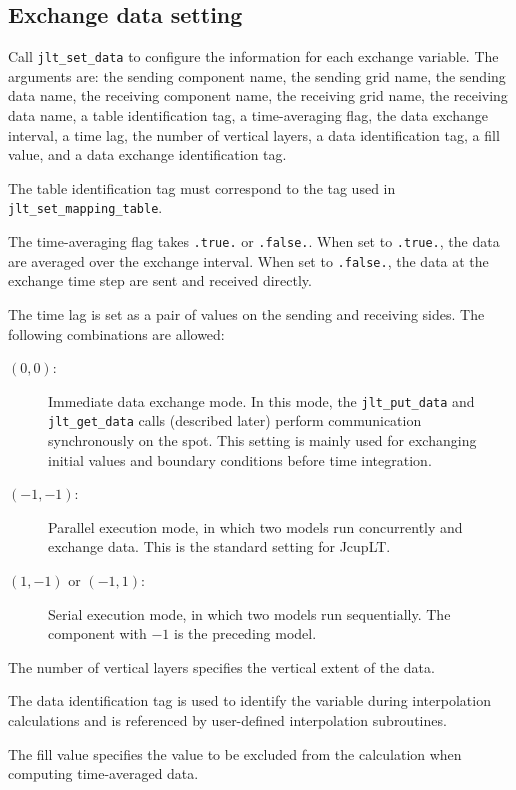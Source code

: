 \documentclass[11pt,a4paper]{report}
\begin{document}
\subsection{Exchange data setting}

Call \texttt{jlt\_set\_data}
to configure the information for each exchange variable.
The arguments are:
the sending component name,
the sending grid name,
the sending data name,
the receiving component name,
the receiving grid name,
the receiving data name,
a table identification tag,
a time-averaging flag,
the data exchange interval,
a time lag,
the number of vertical layers,
a data identification tag,
a fill value,
and a data exchange identification tag.

The table identification tag
must correspond to the tag used
in \texttt{jlt\_set\_mapping\_table}.

The time-averaging flag
takes \texttt{.true.} or \texttt{.false.}.
When set to \texttt{.true.},
the data are averaged over the exchange interval.
When set to \texttt{.false.},
the data at the exchange time step
are sent and received directly.

The time lag is set as a pair of values
on the sending and receiving sides.
The following combinations are allowed:

\begin{description}
\item[$(0, 0)$:]
  Immediate data exchange mode.
  In this mode, the \texttt{jlt\_put\_data}
  and \texttt{jlt\_get\_data} calls
  (described later) perform communication synchronously
  on the spot.
  This setting is mainly used
  for exchanging initial values and boundary conditions
  before time integration.
\item[$(-1, -1)$:]
  Parallel execution mode,
  in which two models run concurrently
  and exchange data.
  This is the standard setting for JcupLT.
\item[$(1, -1)$ or $(-1, 1)$:]
  Serial execution mode,
  in which two models run sequentially.
  The component with $-1$ is the preceding model.
\end{description}

The number of vertical layers
specifies the vertical extent of the data.

The data identification tag
is used to identify the variable
during interpolation calculations
and is referenced by user-defined interpolation subroutines.

The fill value specifies the value
to be excluded from the calculation
when computing time-averaged data.
\end{document}
